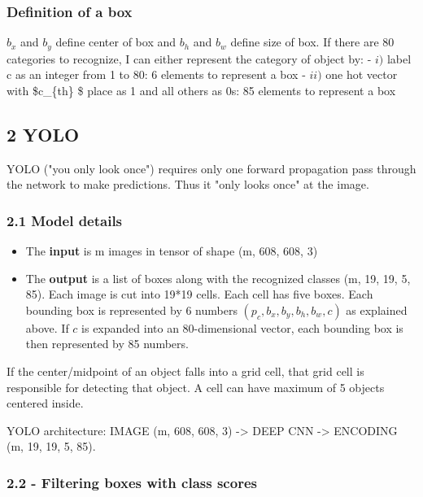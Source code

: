 \documentclass[11pt]{article}
\providecommand{\tightlist}{%
      \setlength{\itemsep}{0pt}\setlength{\parskip}{0pt}}
\begin{document}
    \subsubsection{Definition of a box}\label{definition-of-a-box}

\(b_x\) and \(b_y\) define center of box and \(b_h\) and \(b_w\) define
size of box. If there are 80 categories to recognize, I can either
represent the category of object by: - \(i)\) label c as an integer from
1 to 80: 6 elements to represent a box - \(ii)\) one hot vector with
\$c\_\{th\} \$ place as 1 and all others as 0s: 85 elements to represent
a box

    \subsection{2 YOLO}\label{yolo}

    YOLO ("you only look once") requires only one forward propagation pass
through the network to make predictions. Thus it "only looks once" at
the image.

    \subsubsection{2.1 Model details}\label{model-details}

\begin{itemize}
\tightlist
\item
  The \textbf{input} is m images in tensor of shape (m, 608, 608, 3)
\item
  The \textbf{output} is a list of boxes along with the recognized
  classes (m, 19, 19, 5, 85). Each image is cut into 19*19 cells. Each
  cell has five boxes. Each bounding box is represented by 6 numbers
  \((p_c, b_x, b_y, b_h, b_w, c)\) as explained above. If \(c\) is
  expanded into an 80-dimensional vector, each bounding box is then
  represented by 85 numbers.
\end{itemize}

If the center/midpoint of an object falls into a grid cell, that grid
cell is responsible for detecting that object. A cell can have maximum
of 5 objects centered inside.

YOLO architecture: IMAGE (m, 608, 608, 3) -\textgreater{} DEEP CNN
-\textgreater{} ENCODING (m, 19, 19, 5, 85).

    \subsubsection{2.2 - Filtering boxes with class
scores}\label{filtering-boxes-with-class-scores}
\end{document}
